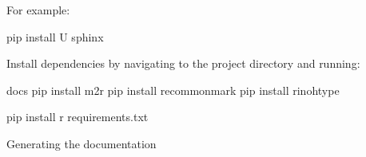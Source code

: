 \documentclass[letterpaper,10pt,english]{sphinxmanual}
\begin{document}
For example:

\begin{sphinxVerbatim}[commandchars=\\\{\}]
pip install \PYGZhy{}U sphinx
\end{sphinxVerbatim}

Install dependencies by navigating to the  project directory and running:

\begin{sphinxVerbatim}[commandchars=\\\{\}]
 docs
pip install m2r
pip install recommonmark
pip install rinohtype

pip install \PYGZhy{}r requirements.txt
\end{sphinxVerbatim}

Generating the documentation
\end{document}
